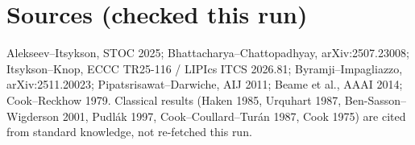 \documentclass[11pt]{article}
\begin{document}
\section*{Sources (checked this run)}
Alekseev--Itsykson, STOC 2025; Bhattacharya--Chattopadhyay, arXiv:2507.23008;
Itsykson--Knop, ECCC TR25-116 / LIPIcs ITCS 2026.81; Byramji--Impagliazzo,
arXiv:2511.20023; Pipatsrisawat--Darwiche, AIJ 2011; Beame et al., AAAI 2014;
Cook--Reckhow 1979. Classical results (Haken 1985, Urquhart 1987,
Ben-Sasson--Wigderson 2001, Pudlák 1997, Cook--Coullard--Turán 1987, Cook 1975)
are cited from standard knowledge, not re-fetched this run.

\end{document}
